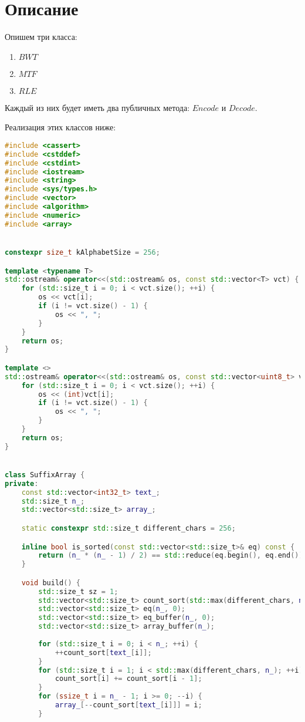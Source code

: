 \section{Описание}

Опишем три класса:
\begin{enumerate}
    \item $BWT$
    \item $MTF$
    \item $RLE$
\end{enumerate}
Каждый из них будет иметь два публичных метода: $Encode$ и $Decode$.

Реализация этих классов ниже:

\begin{lstlisting}[language=C++]
#include <cassert>
#include <cstddef>
#include <cstdint>
#include <iostream>
#include <string>
#include <sys/types.h>
#include <vector>
#include <algorithm>
#include <numeric>
#include <array>


constexpr size_t kAlphabetSize = 256;

template <typename T>
std::ostream& operator<<(std::ostream& os, const std::vector<T> vct) {
    for (std::size_t i = 0; i < vct.size(); ++i) {
        os << vct[i];
        if (i != vct.size() - 1) {
            os << ", ";
        }
    }
    return os;
}

template <>
std::ostream& operator<<(std::ostream& os, const std::vector<uint8_t> vct) {
    for (std::size_t i = 0; i < vct.size(); ++i) {
        os << (int)vct[i];
        if (i != vct.size() - 1) {
            os << ", ";
        }
    }
    return os;
}


class SuffixArray {
private:
    const std::vector<int32_t> text_;
    std::size_t n_;
    std::vector<std::size_t> array_;

    static constexpr std::size_t different_chars = 256;

    inline bool is_sorted(const std::vector<std::size_t>& eq) const {
        return (n_ * (n_ - 1) / 2) == std::reduce(eq.begin(), eq.end());
    }

    void build() {
        std::size_t sz = 1;
        std::vector<std::size_t> count_sort(std::max(different_chars, n_), 0);
        std::vector<std::size_t> eq(n_, 0);
        std::vector<std::size_t> eq_buffer(n_, 0);
        std::vector<std::size_t> array_buffer(n_);
        
        for (std::size_t i = 0; i < n_; ++i) {
            ++count_sort[text_[i]];
        }
        for (std::size_t i = 1; i < std::max(different_chars, n_); ++i) {
            count_sort[i] += count_sort[i - 1];
        }
        for (ssize_t i = n_ - 1; i >= 0; --i) {
            array_[--count_sort[text_[i]]] = i;
        }



\end{lstlisting}
